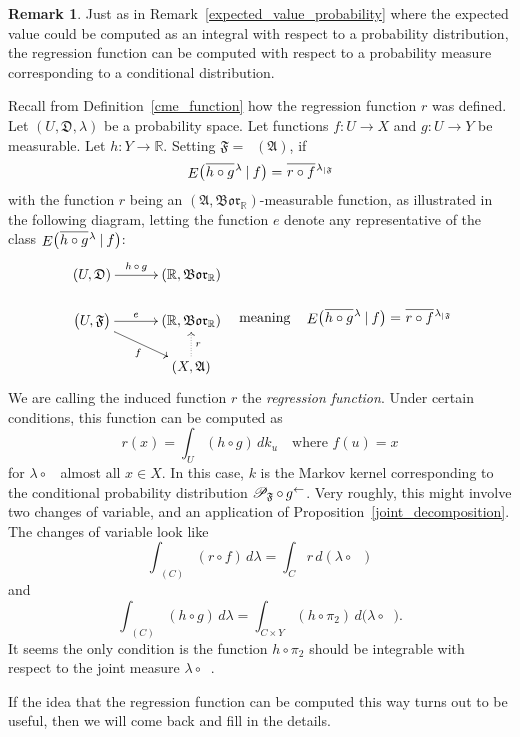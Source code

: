 \documentclass[
twoside=true,
paper=letter,
fontsize=9pt,
pagesize=auto,
leqno,
openany,
headsepline,
overfullrule,
]{scrbook}
\theoremstyle{plain}
\theoremstyle{plain}
\theoremstyle{definition}
\newtheorem{rmk}[thm]{Remark}
\theoremstyle{bfnoteitalic}
\theoremstyle{bfnoteroman}
\newcommand{\sigalg}[1]{\mathfrak{#1}}
\newcommand{\cali}[1]{\mathscr{#1}}
\newcommand{\given}{\mathbin{\vert}}
\newcommand{\kondexpgvn}[2]
{\mathop{E}\bigl(#1\given#2\bigr)}
\newcommand{\condprobop}[1]{\mathop{\cali{P}\hspace{-1pt}}\nolimits_{#1}}
\newcommand{\borel}{\mathfrak{Bor}}
\newcommand{\restrictedto}[1]{_{\lvert#1}\kern-1.5pt}
\newcommand{\preimage}[1]{\mathop{#1^{\leftarrow}}}
\newcommand{\R}{\mathbb{R}}
\newcommand{\sigmaalgebra}{\sigalg{A}}
\newcommand{\funcf}{f}
\newcommand{\funcg}{g}
\newcommand{\funch}{h}
\newcommand{\funck}{k}
\newcommand{\measurespace}{X}
\newcommand{\measurespaceii}{Y}
\newcommand{\mspaceelt}{x}
\newcommand{\measlambda}{\lambda}
\newcommand{\setiii}{C}
\newcommand{\projectiontwo}{\pi_2}
\newcommand{\uspace}{U}%
\newcommand{\uspaceelt}{u}
\newcommand{\uspacesig}{\sigalg{D}}
\newcommand*\xbar[1]{%
   \hbox{%
     \vbox{%
       \hrule height 0.4pt %
       \kern0.4ex%
       \hbox{%
         \ensuremath{#1}%
       }%
     }%
   }%
}
\newcommand{\lebclass}[1]{\hspace{.5pt}\xbar{#1}\hspace{0.5pt}}
\newcommand{\ellclass}[2]{\lebclass{#1}^{#2}}
\begin{document}
\begin{rmk}
Just as in Remark~\ref{expected_value_probability} where the expected value could be computed as an integral with respect to a probability distribution, the regression function can be computed with respect to a probability measure corresponding to a conditional distribution.

Recall from Definition~\ref{cme_function} how the regression function $r$ was defined.
Let
$(\uspace,\uspacesig,\measlambda)$ be a probability space.
Let functions
$\funcf:\uspace\to\measurespace$
and
$\funcg:\uspace\to\measurespaceii$
be measurable.
Let $\funch:\measurespaceii\to\R$.
Setting $\sigalg{F}=\preimage{\funcf}(\sigmaalgebra)$, if
\[
\kondexpgvn{\ellclass{\funch\circ\funcg}{\measlambda}}{\funcf}
=
\ellclass{r \circ \funcf}{\measlambda\restrictedto{\sigalg{F}}}
\]
with the function  $r$ being an $(\sigmaalgebra,\borel_\R)$\hyp{}measurable function,
as illustrated in the following diagram, letting the function $e$ denote any representative of the class
$\kondexpgvn{\ellclass{\funch\circ\funcg}{\measlambda}}{\funcf}$:
\[
\begin{gathered}
\xymatrix@R=16pt@C=30pt{
(\uspace, \uspacesig)
\ar[r]^-{\funch\,\circ\,\funcg}
&
(\R, \borel_\R)
\\
\bigl(\uspace, \sigalg{F} \bigr)
\ar[r]^-{e}
\ar[dr]_{\funcf}
&
(\R,\borel_\R)
\\
&
(\measurespace, \sigmaalgebra)
\ar@{.>}[u]_{r}
\\
}
\end{gathered}
\quad
\text{meaning}
\quad
\kondexpgvn{\ellclass{\funch\circ\funcg}{\measlambda}}{\funcf}
=
\ellclass{r \circ \funcf}{\measlambda\restrictedto{\sigalg{F}}}
\]
We are calling the induced function $r$ the \emph{regression function}.
Under certain conditions, this function can be computed as
\[
r(\mspaceelt)
=
\int_\uspace (\funch\circ\funcg) \, d \funck_\uspaceelt
\quad
\text{where $\funcf(\uspaceelt)=\mspaceelt$}
\]
for $\measlambda\circ \preimage{\funcf}$ almost all $\mspaceelt\in\measurespace$.
In this case, $\funck$ is the Markov kernel corresponding to the conditional probability distribution
$\condprobop{\sigalg{F}}\circ \preimage{\funcg}$.
Very roughly, this might involve two changes of variable, and an application of
Proposition~\ref{joint_decomposition}.
The changes of variable look like
\[
\int_{\preimage{\funcf}(\setiii)}
(r\circ\funcf)\, d\measlambda
=
\int_\setiii r\, d(\lambda\circ\preimage{\funcf})
\]
and
\[
\int_{\preimage{\funcf}(\setiii)}
(\funch\circ\funcg)\, d\measlambda
=
\int_{\setiii\times\measurespaceii}
(\funch\circ\projectiontwo)
\,d\bigl( \measlambda \circ \preimage{(\funcf,\funcg)} \bigr).
\]
It seems the only condition is the function $\funch\circ\projectiontwo$ should be integrable with respect to the joint measure
$\measlambda \circ \preimage{(\funcf,\funcg)}$.

If the idea that the regression function can be computed this way turns out to be useful, then we will come back and fill in the details.
\end{rmk}
\end{document}
